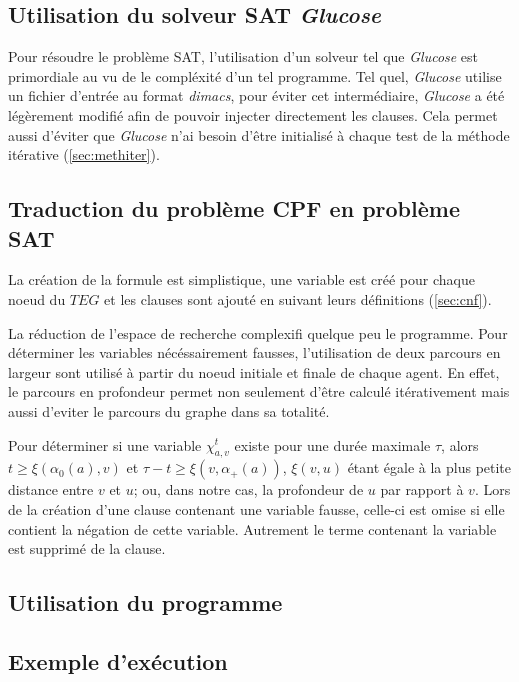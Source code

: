 \documentclass[french, 10pt, letterpaper]{article}
\theoremstyle{definition}
\theoremstyle{proposition}
\theoremstyle{example}
\begin{document}
    \subsection{Utilisation du solveur SAT \emph{Glucose}}
    \label{sec:satsolver}

    Pour résoudre le problème SAT, l'utilisation d'un solveur tel que \emph{Glucose} est primordiale au vu de le compléxité d'un tel programme.
    Tel quel, \emph{Glucose} utilise un fichier d'entrée au format \emph{dimacs}, pour éviter cet intermédiaire, \emph{Glucose} a été 
    légèrement modifié afin de pouvoir injecter directement les clauses.
    Cela permet aussi d'éviter que \emph{Glucose} n'ai besoin d'être initialisé à chaque test de la méthode itérative (\ref{sec:methiter}).

    \subsection{Traduction du problème CPF en problème SAT}

    La création de la formule est simplistique, une variable est créé pour chaque noeud du $TEG$ et les clauses sont ajouté en
    suivant leurs définitions (\ref{sec:cnf}).

    La réduction de l'espace de recherche complexifi quelque peu le programme. 
    Pour déterminer les variables nécéssairement fausses, l'utilisation de deux parcours en largeur sont utilisé à partir
    du noeud initiale et finale de chaque agent.
    En effet, le parcours en profondeur permet non seulement d'être calculé itérativement mais aussi d'eviter le parcours du graphe dans sa totalité.

    Pour déterminer si une variable $\chi^t_{a, v}$ existe pour une durée maximale $\tau$, alors $t \ge \xi(\alpha_0(a), v)$ et
    $\tau - t \ge \xi(v, \alpha_+(a))$, $\xi(v, u)$ étant égale à la plus petite distance entre $v$ et $u$; ou, dans notre cas,
    la profondeur de $u$  par rapport à $v$. 
    Lors de la création d'une clause contenant une variable fausse, celle-ci est omise si elle contient la négation de cette variable.
    Autrement le terme contenant la variable est supprimé de la clause.


    \subsection{Utilisation du programme}
    \subsection{Exemple d'exécution}
    \label{sec:example}
\end{document}
